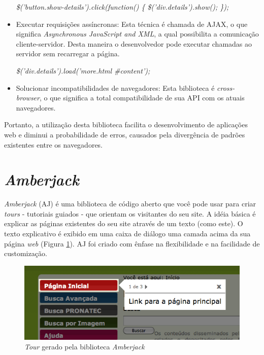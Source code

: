 \begin{itemize}
\begin{center}
\textit{\$('button.show-details').click(function() \{ \$('div.details').show(); \});}
\end{center}

\item Executar requisições assíncronas: Esta técnica é chamada de AJAX, o que significa \textit{Asynchronous JavaScript and XML}, a qual possibilita a comunicação cliente-servidor. Desta maneira o desenvolvedor pode executar chamadas ao servidor sem recarregar a página.

\begin{center}
\textit{\$('div.details').load('more.html \#content');}
\end{center}

\item Solucionar incompatibilidades de navegadores: Esta biblioteca é \textit{cross-browser}, o que significa a total compatibilidade de sua API com os atuais navegadores.
\end{itemize}

Portanto, a utilização desta biblioteca facilita o desenvolvimento de aplicações web e diminui a probabilidade de erros, causados pela divergência de padrões existentes entre os navegadores.

\section{\textit{Amberjack}}
\label{sec:amberjack}

\textit{Amberjack} (AJ) é uma biblioteca de código aberto que você pode usar para criar \textit{tours} - tutoriais guiados - que orientam os visitantes do seu site. A idéia básica é explicar as páginas existentes do seu site através de um texto (como este). O texto explicativo é exibido em uma caixa de diálogo uma camada acima da sua página \textit{web} (Figura \ref{figura_22}). AJ foi criado com ênfase na flexibilidade e na facilidade de customização.

\begin{figure}[ht]
    \centering
    \includegraphics[width=0.9 \textwidth]{figuras/figura_33}
    \caption{\textit{Tour} gerado pela biblioteca \textit{Amberjack}}
    \label{figura_22}
\end{figure}

